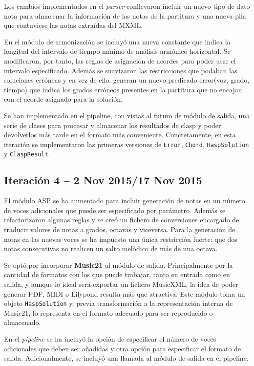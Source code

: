 Los cambios implementados en el \textit{parser} conllevaron incluir un nuevo tipo de dato nota para almacenar la información de las notas de la partitura y una nueva pila que contuviese las notas extraídas del MXML.

En el módulo de armonización se incluyó una nueva constante que indica la longitud del intervalo de tiempo mínimo de análisis armónico horizontal. Se modificaron, por tanto, las reglas de asignación de acordes para poder usar el intervalo especificado. Además se suavizaron las restricciones que podaban las soluciones erróneas y en vez de ello, generan un nuevo predicado error(voz, grado, tiempo) que indica los grados erróneos presentes en la partitura que no encajan con el acorde asignado para la solución. 

 Se han implementado en el pipeline, con vistas al futuro de módulo de salida, una serie de clases para procesar y almacenar los resultados de clasp y poder devolverlos más tarde en el formato más conveniente. Concretamente, en esta iteración se implementaron las primeras versiones de \texttt{Error}, \texttt{Chord}, \texttt{HaspSolution} y \texttt{ClaspResult}.

\subsection{Iteración 4  -- 2 Nov 2015/17 Nov 2015}
\label{sec:fourth_iteration}
El módulo ASP se ha aumentado para incluir generación de notas en un número de voces adicionales que puede ser especificado por parámetro. Además se refactorizaron algunas reglas y se creó un fichero de conversiones encargado de traducir valores de notas a grados, octavas y viceversa. Para la generación de notas en las nuevas voces se ha impuesto una única restricción fuerte: que dos notas consecutivas no realicen un salto melódico de más de una octava.

Se optó por incorporar \textbf{Music21} al módulo de salida. Principalmente por la cantidad de formatos con los que puede trabajar, tanto en entrada como en salida, y aunque lo ideal será exportar un fichero MusicXML, la idea de poder generar PDF, MIDI o Lilypond resulta más que atractiva. Este módulo toma un objeto \texttt{HaspSolution} y, previa transformación a la representación interna de Music21, lo representa en el formato adecuado para ser reproducido o almacenado.  

En el \textit{pipeline} se ha incluyó la opción de especificar el número de voces adicionales que deben ser añadidas y otra opción para especificar el formato de salida. Adicionalmente, se incluyó una llamada al módulo de salida en el pipeline.

